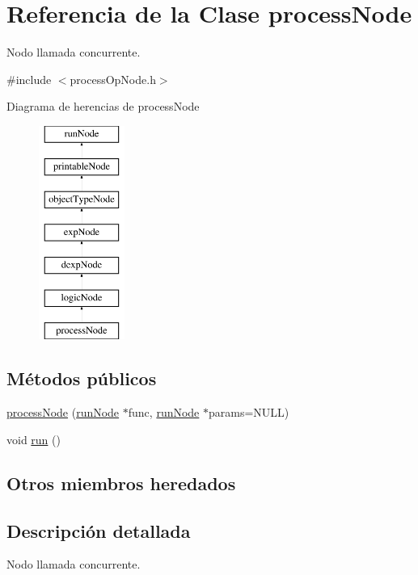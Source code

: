 \hypertarget{classprocessNode}{\section{Referencia de la Clase process\-Node}
\label{classprocessNode}
}


Nodo llamada concurrente.  




{\ttfamily \#include $<$process\-Op\-Node.\-h$>$}

Diagrama de herencias de process\-Node\begin{figure}[H]
\begin{center}
\leavevmode
\includegraphics[height=7.000000cm]{classprocessNode}
\end{center}
\end{figure}
\subsection*{Métodos públicos}
\begin{DoxyCompactItemize}
\item 
\hyperlink{classprocessNode_a3b5dd170217f1d76c9f10aa4164bd74e}{process\-Node} (\hyperlink{classrunNode}{run\-Node} $\ast$func, \hyperlink{classrunNode}{run\-Node} $\ast$params=N\-U\-L\-L)
\item 
void \hyperlink{classprocessNode_a9099657c572e7326578a0464439c048f}{run} ()
\end{DoxyCompactItemize}
\subsection*{Otros miembros heredados}


\subsection{Descripción detallada}
Nodo llamada concurrente. 

